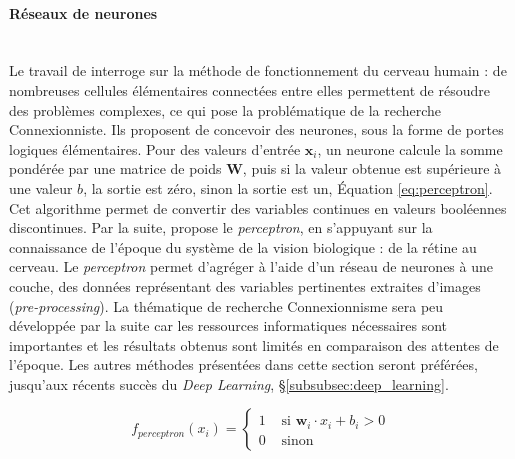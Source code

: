 \paragraph{Réseaux de neurones}\mbox{} \label{parag:neural_networks} \\
Le travail de \citeauthor{mcculloch_logical_1943} \cite{mcculloch_logical_1943} interroge sur la méthode de fonctionnement du cerveau humain : de nombreuses cellules élémentaires connectées entre elles permettent de résoudre des problèmes complexes, ce qui pose la problématique de la recherche Connexionniste.
Ils proposent de concevoir des neurones, sous la forme de portes logiques élémentaires.
Pour des valeurs d'entrée $\mathbf{x}_i$, un neurone calcule la somme pondérée par une matrice de poids $\mathbf{W}$, puis si la valeur obtenue est supérieure à une valeur $b$, la sortie est zéro, sinon la sortie est un, Équation \ref{eq:perceptron}.
Cet algorithme permet de convertir des variables continues en valeurs booléennes discontinues.
Par la suite, \citeauthor{rosenblatt_perceptron_1958} \cite{rosenblatt_perceptron_1958} propose le \textit{perceptron}, en s'appuyant sur la connaissance de l'époque du système de la vision biologique : de la rétine au cerveau.
Le \textit{perceptron} permet d'agréger à l'aide d'un réseau de neurones à une couche, des données représentant des variables pertinentes extraites d'images (\textit{pre-processing}).
La thématique de recherche Connexionnisme sera peu développée par la suite car les ressources informatiques nécessaires sont importantes et les résultats obtenus sont limités en comparaison des attentes de l'époque.
Les autres méthodes présentées dans cette section seront préférées, jusqu'aux récents succès du \textit{Deep Learning}, §\ref{subsubsec:deep_learning}.

\begin{equation} \label{eq:perceptron}
f_{perceptron}(x_i)=\left\{\begin{array}{ll}{1} & {\text { si } \mathbf{w}_i \cdot x_i + b_i > 0} \\ {0} & {\text { sinon }}\end{array}\right.
\end{equation}

